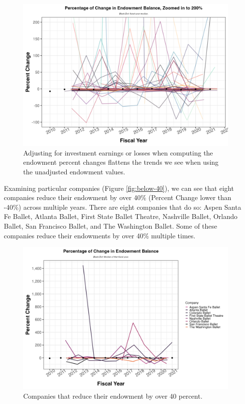 \documentclass[Dance Data
Project,article,submit,moreauthors,pdftex]{mdpi}
\begin{document}
\begin{figure}[H]
\includegraphics[width=0.8\linewidth,]{../images/pc_endow_flat} \caption{\label{fig:flat} Adjusting for investment earnings or losses when computing the endowment percent changes flattens the trends we see when using the unadjusted endowment values.}\label{fig:flat}
\end{figure}

Examining particular companies (Figure \ref{fig:below-40}), we can see
that eight companies reduce their endowment by over 40\% (Percent Change
lower than -40\%) across multiple years. There are eight companies that
do so: Aspen Santa Fe Ballet, Atlanta Ballet, First State Ballet
Theatre, Nashville Ballet, Orlando Ballet, San Francisco Ballet, and The
Washington Ballet. Some of these companies reduce their endowments by
over 40\% multiple times.

\begin{figure}[H]
\includegraphics[width=0.8\linewidth,]{../images/pc_below_40} \caption{\label{fig:below-40} Companies that reduce their endowment by over 40 percent.}\label{fig:unnamed-chunk-7}
\end{figure}
\end{document}
